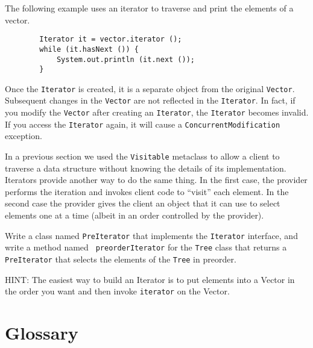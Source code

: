 The following example uses an iterator to traverse and print the
elements of a vector.

\begin{verbatim}
        Iterator it = vector.iterator ();
        while (it.hasNext ()) {
            System.out.println (it.next ());
        }
\end{verbatim}
%
Once the {\tt Iterator} is created, it is a separate object from
the original {\tt Vector}.  Subsequent changes in the {\tt Vector}
are not reflected in the {\tt Iterator}.  In fact, if you
modify the {\tt Vector} after creating an {\tt Iterator},
the {\tt Iterator} becomes invalid.  If you access the
{\tt Iterator} again, it will cause a {\tt ConcurrentModification}
exception.


In a previous section we used the {\tt Visitable} metaclass to
allow a client to traverse a data structure without knowing the
details of its implementation.  Iterators provide another way to do
the same thing.  In the first case, the provider performs the iteration
and invokes client code to ``visit'' each element.  In the second
case the provider gives the client an object that it can use to
select elements one at a time (albeit in an order controlled by
the provider).

\begin{exercise}
Write a class named {\tt PreIterator} that
implements the {\tt Iterator} interface, and write a method named {\tt
preorderIterator} for the {\tt Tree} class that returns a {\tt
PreIterator} that selects the elements of the {\tt Tree} in preorder.

HINT: The easiest way to build an Iterator is to put elements
into a Vector in the order you want and then invoke {\tt iterator}
on the Vector.
\end{exercise}


\section{Glossary}

